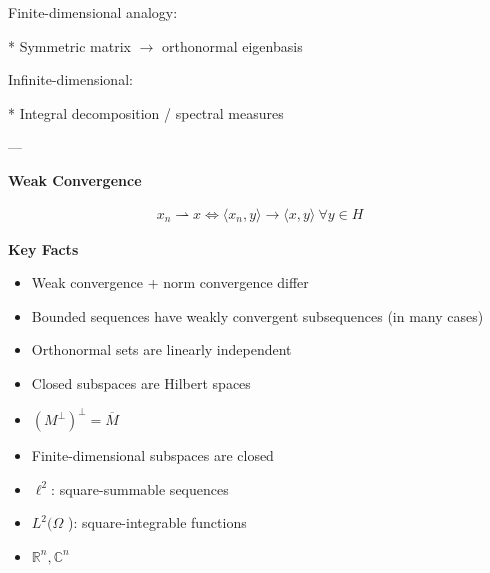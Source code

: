 \documentclass[12pt,a4paper]{report}
\begin{document}
\begin{description}
\begin{description}
Finite-dimensional analogy:

* Symmetric matrix $\to$ orthonormal eigenbasis

Infinite-dimensional:

* Integral decomposition / spectral measures

---
\end{description}

\item {}

\begin{description}
    \item \textbf{Weak Convergence}

\begin{align*}
x_n \rightharpoonup x \iff \langle x_n, y\rangle \to \langle x,y\rangle \ \forall y\in H
\end{align*}

    \item \textbf{Key Facts}

\begin{itemize}
\item Weak convergence + norm convergence differ
\item Bounded sequences have weakly convergent subsequences (in many cases)
\end{itemize}
\end{description}

\item {}

\begin{itemize}
\item Orthonormal sets are linearly independent
\item Closed subspaces are Hilbert spaces
\item $ (M^\perp)^\perp = \overline{M} $
\item Finite-dimensional subspaces are closed
\end{itemize}

\item {}

\begin{itemize}
\item $ \ell^2 $: square-summable sequences
\item $ L^2(\Omega$ ): square-integrable functions
\item $ \mathbb{R}^n, \mathbb{C}^n $
\end{itemize}


\end{description}
\end{document}

